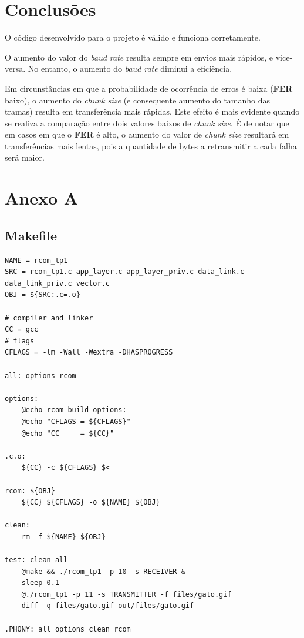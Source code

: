 \documentclass[11pt]{report}
\begin{document}
{\let\clearpage\relax \chapter{Conclusões}}

O código desenvolvido para o projeto é válido e funciona corretamente.

O aumento do valor do \textit{baud rate} resulta sempre em envios mais rápidos,
e vice-versa. No entanto, o aumento do \textit{baud rate} diminui a eficiência.

Em circunstâncias em que a probabilidade de ocorrência de erros é baixa
(\textbf{FER} baixo), o aumento do \textit{chunk size} (e consequente aumento
do tamanho das tramas) resulta em transferência mais rápidas. Este efeito é
mais evidente quando se realiza a comparação entre dois valores baixos de
\textit{chunk size}. É de notar que em casos em que o \textbf{FER} é alto,
o aumento do valor de \textit{chunk size} resultará em transferências mais
lentas, pois a quantidade de bytes a retransmitir a cada falha será maior.

\chapter*{Anexo A}

\section{Makefile}

\begin{lstlisting}
NAME = rcom_tp1
SRC = rcom_tp1.c app_layer.c app_layer_priv.c data_link.c data_link_priv.c vector.c
OBJ = ${SRC:.c=.o}

# compiler and linker
CC = gcc
# flags
CFLAGS = -lm -Wall -Wextra -DHASPROGRESS

all: options rcom

options:
	@echo rcom build options:
	@echo "CFLAGS = ${CFLAGS}"
	@echo "CC     = ${CC}"

.c.o:
	${CC} -c ${CFLAGS} $<

rcom: ${OBJ}
	${CC} ${CFLAGS} -o ${NAME} ${OBJ}

clean:
	rm -f ${NAME} ${OBJ}

test: clean all
	@make && ./rcom_tp1 -p 10 -s RECEIVER &
	sleep 0.1
	@./rcom_tp1 -p 11 -s TRANSMITTER -f files/gato.gif
	diff -q files/gato.gif out/files/gato.gif

.PHONY: all options clean rcom
\end{lstlisting}
\end{document}
